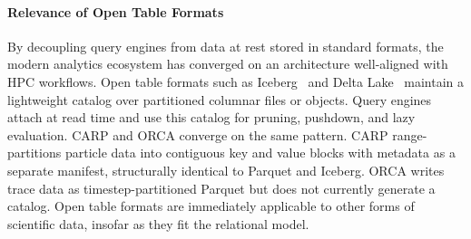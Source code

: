 
\paragraph{Relevance of Open Table Formats}
By decoupling query engines from data at rest stored in standard formats, 
the modern analytics ecosystem has converged on an architecture well-aligned with HPC
workflows.
Open table formats such as Iceberg~\cite{:Iceberg} and Delta Lake~\cite{Armbr2020:Deltalake}
maintain a
lightweight catalog over partitioned
columnar files or objects.
Query engines attach at read time and use this catalog for pruning, pushdown, and lazy evaluation.
CARP and ORCA converge on the same pattern.
CARP range-partitions particle data into contiguous key and value blocks with metadata as a
separate manifest, structurally identical to Parquet and Iceberg.
ORCA writes trace data as timestep-partitioned Parquet but does not currently generate a catalog.
Open table formats are immediately applicable to other forms of scientific data, insofar as they
fit the
relational model.



